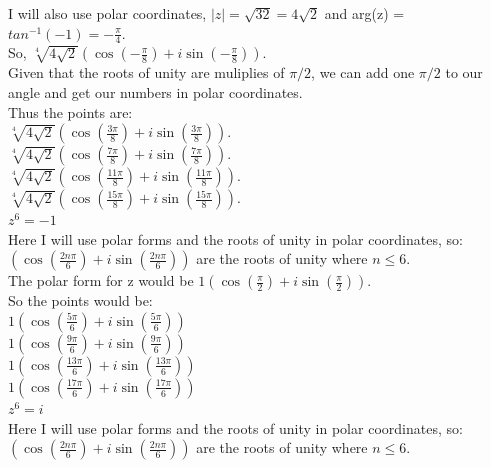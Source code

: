 \documentclass[12pt]{article}
\begin{document}
I will also use polar coordinates, $|z| = \sqrt{32} = 4\sqrt{2}$ and arg(z) = $tan^{-1}(-1) = -\frac{\pi}{4}$.\\
So, $\sqrt[4]{4\sqrt{2}}(\cos(-\frac{\pi}{8}) + i\sin(-\frac{\pi}{8}))$.\\

Given that the roots of unity are muliplies of $\pi/2$, we can add one $\pi/2$ to our angle and get our numbers in polar coordinates.\\

Thus the points are:\\

$\sqrt[4]{4\sqrt{2}}(\cos(\frac{3\pi}{8}) + i\sin(\frac{3\pi}{8}))$.\\
$\sqrt[4]{4\sqrt{2}}(\cos(\frac{7\pi}{8}) + i\sin(\frac{7\pi}{8}))$.\\
$\sqrt[4]{4\sqrt{2}}(\cos(\frac{11\pi}{8}) + i\sin(\frac{11\pi}{8}))$.\\
$\sqrt[4]{4\sqrt{2}}(\cos(\frac{15\pi}{8}) + i\sin(\frac{15\pi}{8}))$.\\


 $z^6 = -1$\\

Here I will use polar forms and the roots of unity in polar coordinates, so:\\

$(\cos(\frac{2n\pi}{6}) + i\sin(\frac{2n\pi}{6}))$ are the roots of unity where $n \leq 6$.\\

The polar form for z would be $1(\cos(\frac{\pi}{2}) + i\sin(\frac{\pi}{2}))$.\\

So the points would be:\\


$1(\cos(\frac{5\pi}{6}) + i\sin(\frac{5\pi}{6}))$\\
$1(\cos(\frac{9\pi}{6}) + i\sin(\frac{9\pi}{6}))$\\
$1(\cos(\frac{13\pi}{6}) + i\sin(\frac{13\pi}{6}))$\\
$1(\cos(\frac{17\pi}{6}) + i\sin(\frac{17\pi}{6}))$\\


 $z^6 = i$\\

Here I will use polar forms and the roots of unity in polar coordinates, so:\\

$(\cos(\frac{2n\pi}{6}) + i\sin(\frac{2n\pi}{6}))$ are the roots of unity where $n \leq 6$.\\
\end{document}
